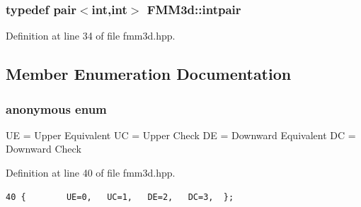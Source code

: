 \subsubsection{\setlength{\rightskip}{0pt plus 5cm}typedef pair$<$int,int$>$ {\bf FMM3d::intpair}}\label{classFMM3d_516fcca2e14cd2e14fd71db54824f696_516fcca2e14cd2e14fd71db54824f696}




Definition at line 34 of file fmm3d.hpp.

\subsection{Member Enumeration Documentation}
\subsubsection{\setlength{\rightskip}{0pt plus 5cm}anonymous enum}\label{classFMM3d_dca29a1140aadadfd92b34a02fa516ef_dca29a1140aadadfd92b34a02fa516ef}


UE = Upper Equivalent UC = Upper Check DE = Downward Equivalent DC = Downward Check \begin{Desc}
\item[Enumerator: ]\par
\begin{description}
\item[{\em 
UE\label{classFMM3d_dca29a1140aadadfd92b34a02fa516ef_dca29a1140aadadfd92b34a02fa516ef0612e93d65abcdaeed533a0876474251}
}]\item[{\em 
UC\label{classFMM3d_dca29a1140aadadfd92b34a02fa516ef_dca29a1140aadadfd92b34a02fa516ef6a2fb30a2dacdda4d74122697262a8b7}
}]\item[{\em 
DE\label{classFMM3d_dca29a1140aadadfd92b34a02fa516ef_dca29a1140aadadfd92b34a02fa516ef3a52f3c22ed6fcde5bf696a6c02c9e73}
}]\item[{\em 
DC\label{classFMM3d_dca29a1140aadadfd92b34a02fa516ef_dca29a1140aadadfd92b34a02fa516efcf75e54791dd1f49f918345fdfe2430b}
}]\end{description}
\end{Desc}



Definition at line 40 of file fmm3d.hpp.

\footnotesize\begin{verbatim}40 {        UE=0,   UC=1,   DE=2,   DC=3,  };
\end{verbatim}\normalsize 




